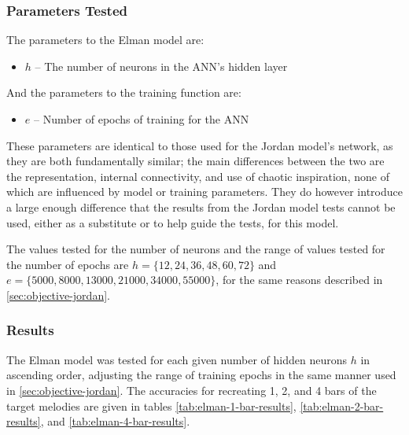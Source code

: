 \documentclass[ author={Stephen Livermore-Tozer},
				supervisor={Dr. Peter Flach},
				degree={MEng},
				title={Algorithmic Co-composition Using Machine Learning},
				subtitle={},
				type={research},
				year={2016} ]{dissertation}
\begin{document}
	\subsubsection{Parameters Tested}
	
	The parameters to the Elman model are:
	\begin{itemize}
		\item $h$ -- The number of neurons in the ANN's hidden layer
	\end{itemize}
	And the parameters to the training function are:
	\begin{itemize}
		\item $e$ -- Number of epochs of training for the ANN
	\end{itemize}
	
	These parameters are identical to those used for the Jordan model's network, as they are both fundamentally similar; the main differences between the two are the representation, internal connectivity, and use of chaotic inspiration, none of which are influenced by model or training parameters. They do however introduce a large enough difference that the results from the Jordan model tests cannot be used, either as a substitute or to help guide the tests, for this model.
	
	The values tested for the number of neurons and the range of values tested for the number of epochs are $h = \{12, 24, 36, 48, 60, 72\}$ and $e = \{5000, 8000, 13000, 21000, 34000, 55000\}$, for the same reasons described in \ref{sec:objective-jordan}.
	
	\subsubsection{Results}
	
	The Elman model was tested for each given number of hidden neurons $h$ in ascending order, adjusting the range of training epochs in the same manner used in \ref{sec:objective-jordan}. The accuracies for recreating 1, 2, and 4 bars of the target melodies are given in tables \ref{tab:elman-1-bar-results}, \ref{tab:elman-2-bar-results}, and \ref{tab:elman-4-bar-results}.
	
\end{document}
